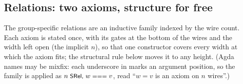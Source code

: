 \subsection{Relations: two axioms, structure for free}\label{sec:sn-relations}

The group-specific relations are an inductive family indexed by the wire
count.  Each axiom is stated once, with its gates at the bottom of the
wires and the width left open (the implicit $n$), so that one constructor
covers every width at which the axiom fits; the structural rule
 below moves it to any height.  (Agda names may be mixfix:
each underscore in  marks an argument
position, so the family is applied as $n\;\aid{SRel,}\;w \aidrel{===}
v$, read ``$w = v$ is an axiom on $n$ wires''.)

\begin{center}
\begin{minipage}[c]{0.58\linewidth}
\begingroup\setlength{\mathindent}{0pt}
\begin{code}%
\>[0]\AgdaSpace{}%
\AgdaSpace{}%
\AgdaSymbol{:}\AgdaSpace{}%
\AgdaSymbol{(}\AgdaSpace{}%
\AgdaSymbol{:}\AgdaSpace{}%
\AgdaSymbol{)}\AgdaSpace{}%
\AgdaSpace{}%
\AgdaSpace{}%
\AgdaSymbol{(}\AgdaSpace{}%
\AgdaSymbol{)}\AgdaSpace{}%
\<%
\\
\>[0][@{}l@{\AgdaIndent{0}}]%
\>[2]%
\>[14]\AgdaSymbol{:}\AgdaSpace{}%
\AgdaSymbol{(}\AgdaSpace{}%
\AgdaSymbol{)}\AgdaSpace{}%
\AgdaSpace{}%
\AgdaSpace{}%
\AgdaSpace{}%
\AgdaSpace{}%
\AgdaOperator{\AgdaDatatype{===}}\AgdaSpace{}%
\<%
\\
%
\>[2]\AgdaSpace{}%
\AgdaSymbol{:}\AgdaSpace{}%
\AgdaSymbol{(}\AgdaSpace{}%
\AgdaSymbol{)}\AgdaSpace{}%
\AgdaSpace{}%
\AgdaSpace{}%
\AgdaSpace{}%
\AgdaSpace{}%
\AgdaSpace{}%
\AgdaSpace{}%
\AgdaSpace{}%
\AgdaOperator{\AgdaDatatype{===}}\AgdaSpace{}%
\AgdaSpace{}%
\AgdaSpace{}%
\AgdaSpace{}%
\AgdaSpace{}%
\AgdaSpace{}%
\AgdaSpace{}%
\<%
\end{code}
\endgroup
\end{minipage}\hspace{2.5em}%
\begin{minipage}[c]{0.28\linewidth}\centering
  \\[4pt]
\end{minipage}
\end{center}

